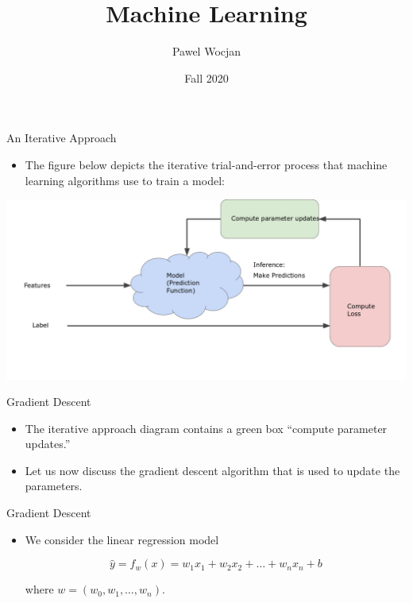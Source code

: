 \documentclass{beamer}
\title[ML]{Machine Learning}
\author{Pawel Wocjan}
\institute{University of Central Florida}
\date{Fall 2020}
\begin{document}
\begin{frame}
  \titlepage
\end{frame}


\begin{frame}{An Iterative Approach}
\begin{itemize}
    \item The figure below depicts the iterative trial-and-error process that machine learning algorithms use to train a model:
\end{itemize}

\bigskip
\includegraphics[width=\textwidth]{images/GradientDescentDiagram.png}
\end{frame}


\begin{frame}{Gradient Descent}
\begin{itemize}
\item The iterative approach diagram contains a green box ``compute parameter updates.'' 

\medskip    
\item Let us now discuss the gradient descent algorithm that is used to update the parameters.
\end{itemize}
\end{frame}


\begin{frame}{Gradient Descent}
\begin{itemize}
\item We consider the linear regression model 

$$\hat{y}=f_w(x) = w_1 x_1 + w_2 x_2 + \ldots + w_n x_n + b$$

\medskip
where $w=(w_0, w_1,\ldots,w_n)$.
\end{itemize}
\end{frame}

\end{document}
